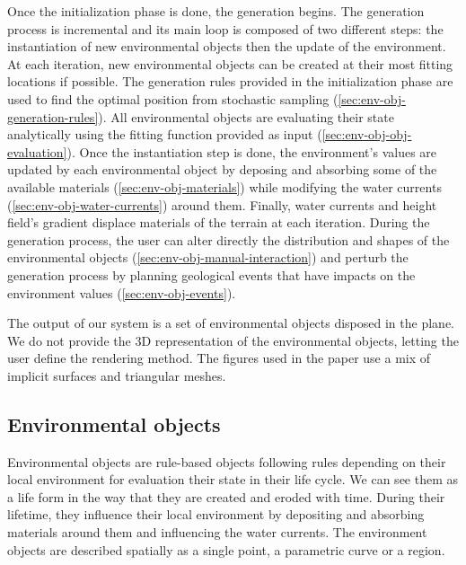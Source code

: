 Once the initialization phase is done, the generation begins. The generation process is incremental and its main loop is composed of two different steps: the instantiation of new environmental objects then the update of the environment.
At each iteration, new environmental objects can be created at their most fitting locations if possible. The generation rules provided in the initialization phase are used to find the optimal position from stochastic sampling (\cref{sec:env-obj-generation-rules}). 
All environmental objects are evaluating their state analytically using the fitting function provided as input (\cref{sec:env-obj-obj-evaluation}).
Once the instantiation step is done, the environment's values are updated by each environmental object by deposing and absorbing some of the available materials (\cref{sec:env-obj-materials}) while modifying the water currents (\cref{sec:env-obj-water-currents}) around them. Finally, water currents and height field's gradient displace materials of the terrain at each iteration.
During the generation process, the user can alter directly the distribution and shapes of the environmental objects (\cref{sec:env-obj-manual-interaction}) and perturb the generation process by planning geological events that have impacts on the environment values (\cref{sec:env-obj-events}).

The output of our system is a set of environmental objects disposed in the plane. We do not provide the 3D representation of the environmental objects, letting the user define the rendering method. The figures used in the paper use a mix of implicit surfaces and triangular meshes.



\subsection{Environmental objects}
\label{sec:env-obj-environmental-objects}

Environmental objects are rule-based objects following rules depending on their local environment for evaluation their state in their life cycle. We can see them as a life form in the way that they are created and eroded with time. During their lifetime, they influence their local environment by depositing and absorbing materials around them and influencing the water currents. The environment objects are described spatially as a single point, a parametric curve or a region.

